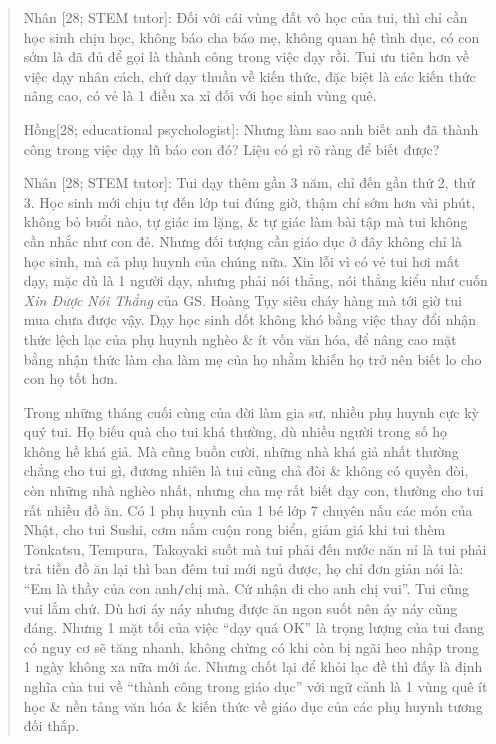 \documentclass[12pt,oneside]{book}
\begin{document}
\begin{quote}
	{\sf Nhân [28; STEM tutor]}: Đối với cái vùng đất vô học của tui, thì chỉ cần học sinh chịu học, không báo cha báo mẹ, không quan hệ tình dục, có con sớm là đã đủ để gọi là thành công trong việc dạy rồi. Tui ưu tiên hơn về việc dạy nhân cách, chứ dạy thuần về kiến thức, đặc biệt là các kiến thức nâng cao, có vẻ là 1 điều xa xỉ đối với học sinh vùng quê.
	
	{\sf Hồng[28; educational psychologist]}: Nhưng làm sao anh biết anh đã thành công trong việc dạy lũ báo con đó? Liệu có gì rõ ràng để biết được?
	
	{\sf Nhân [28; STEM tutor]}: Tui dạy thêm gần 3 năm, chỉ đến gần thứ 2, thứ 3. Học sinh mới chịu tự đến lớp tui đúng giờ, thậm chí sớm hơn vài phút, không bỏ buổi nào, tự giác im lặng, \& tự giác làm bài tập mà tui không cần nhắc như con đẻ. Nhưng đối tượng cần giáo dục ở đây không chỉ là học sinh, mà cả phụ huynh của chúng nữa. Xin lỗi vì có vẻ tui hơi mất dạy, mặc dù là 1 người dạy, nhưng phải nói thẳng, nói thẳng kiểu như cuốn {\it Xin Được Nói Thẳng} của GS. {\sc Hoàng Tụy} siêu cháy hàng mà tới giờ tui mua chưa được vậy. Dạy học sinh dốt không khó bằng việc thay đổi nhận thức lệch lạc của phụ huynh nghèo \& ít vốn văn hóa, để nâng cao mặt bằng nhận thức làm cha làm mẹ của họ nhằm khiến họ trở nên biết lo cho con họ tốt hơn.
	
	Trong những tháng cuối cùng của đời làm gia sư, nhiều phụ huynh cực kỳ quý tui. Họ biếu quà cho tui khá thường, dù nhiều người trong số họ không hề khá giả. Mà cũng buồn cười, những nhà khá giả nhất thường chẳng cho tui gì, đương nhiên là tui cũng chả đòi \& không có quyền đòi, còn những nhà nghèo nhất, nhưng cha mẹ rất biết dạy con, thường cho tui rất nhiều đồ ăn. Có 1 phụ huynh của 1 bé lớp 7 chuyên nấu các món của Nhật, cho tui Sushi, cơm nắm cuộn rong biển, giảm giá khi tui thèm Tonkatsu, Tempura, Takoyaki suốt mà tui phải đến nước năn nỉ là tui phải trả tiền đồ ăn lại thì ban đêm tui mới ngủ được, họ chỉ đơn giản nói là: ``Em là thầy của con anh{\tt/}chị mà. Cứ nhận đi cho anh chị vui''. Tui cũng vui lắm chứ. Dù hơi áy náy nhưng được ăn ngon suốt nên áy náy cũng đáng. Nhưng 1 mặt tối của việc ``dạy quá OK'' là trọng lượng của tui đang có nguy cơ sẽ tăng nhanh, không chừng có khi còn bị ngãi heo nhập trong 1 ngày không xa nữa mới ác. Nhưng chốt lại để khỏi lạc đề thì đấy là định nghĩa của tui về ``thành công trong giáo dục'' với ngữ cảnh là 1 vùng quê ít học \& nền tảng văn hóa \& kiến thức về giáo dục của các phụ huynh tương đối thấp.
	

\end{quote}
\end{document}
